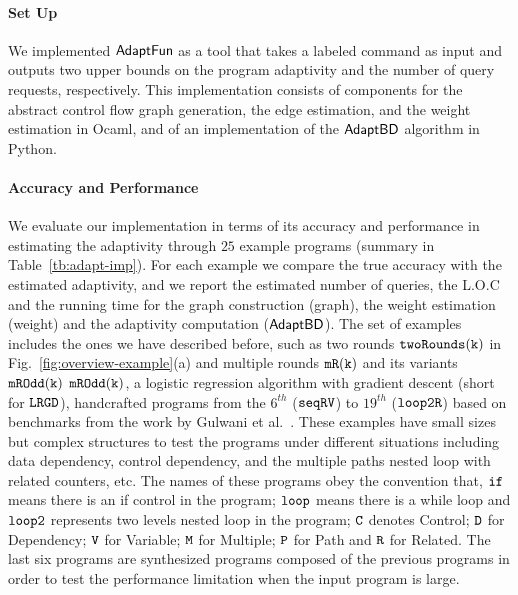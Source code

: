 
\paragraph{Set Up}
We implemented $\textsf{AdaptFun}$ as a tool that takes a labeled command as input 
and outputs two upper bounds on the program adaptivity and the number of query requests, respectively.
This implementation consists of components for the 
abstract control flow graph generation,
the edge estimation, and the weight estimation in Ocaml, 
and of an implementation of the $\mathsf{AdaptBD}$ algorithm in Python.


\paragraph{Accuracy and Performance}

We evaluate our implementation in terms of its accuracy and performance in estimating the adaptivity
through $25$ example programs (summary in Table~\ref{tb:adapt-imp}).
For each example we compare the true accuracy with the estimated adaptivity, and we report the estimated number of queries, the L.O.C and the running time for the graph construction (graph), the weight estimation (weight) and the adaptivity computation ($\mathsf{AdaptBD}$).
The set of examples includes the ones we have described before, such as two rounds $\mathtt{twoRounds(k)}$ in
Fig.~\ref{fig:overview-example}(a) and multiple rounds $ \mathtt{mR(k)}$ and its variants $\mathtt{mROdd(k)}$ $\mathtt{mROdd(k)}$,
a logistic regression algorithm with gradient descent (short for $\mathtt{LRGD}$),
handcrafted programs from the $6^{th}$ ($\mathtt{seqRV}$) to $19^{th}$ ($\mathtt{loop2R}$) based on benchmarks from the work by Gulwani et al.~\cite{GulwaniJK09}. These examples have small sizes but complex structures to test the programs under different situations including
data dependency, control dependency, and the multiple paths nested loop with related counters, etc. The names of these programs obey the convention that,
$\mathtt{if}$ means there is an if control in the program;
$\mathtt{loop}$ means there is a while loop and $\mathtt{loop2}$ represents two levels nested loop in the program;
$\mathtt{C}$ denotes Control;
$\mathtt{D}$ for Dependency; $\mathtt{V}$ for Variable;
$\mathtt{M}$ for Multiple; $\mathtt{P}$ for Path and $\mathtt{R}$ for Related.
The last six programs are synthesized programs composed of the previous programs in order to test the performance limitation when the input program is large. 


